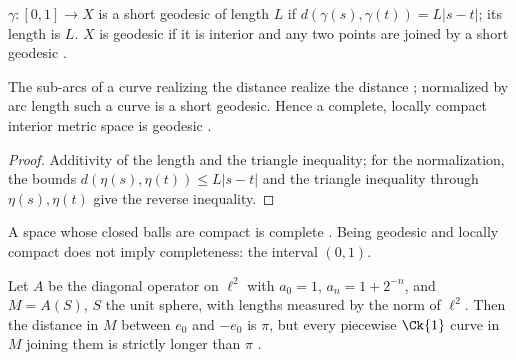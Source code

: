 \begin{definition}
  \label{def:ms-geodesic}
  \leanok
  $\gamma \colon [0, 1] \to X$ is a short geodesic of length $L$ if
  $d(\gamma(s), \gamma(t)) = L |s - t|$; its length is $L$. $X$ is geodesic if it is interior and
  any two points are joined by a short geodesic \cite[Def.~8.1.11]{Lar26}.
\end{definition}

\begin{proposition}
  \label{prop:ms-subarcs}
  \leanok
  The sub-arcs of a curve realizing the distance realize the distance \cite[Obs.~8.1.13]{Lar26};
  normalized by arc length such a curve is a short geodesic. Hence a complete, locally compact
  interior metric space is geodesic \cite[Teorema~8.2.3]{Lar26}.
\end{proposition}

\begin{proof}
  \leanok
  Additivity of the length and the triangle inequality; for the normalization, the bounds
  $d(\eta(s), \eta(t)) \leq L|s - t|$ and the triangle inequality through $\eta(s), \eta(t)$ give the
  reverse inequality.
\end{proof}

\begin{remark}
  \label{rem:ms-proper}
  \leanok
  A space whose closed balls are compact is complete \cite[Obs.~8.2.4]{Lar26}. Being geodesic and
  locally compact does not imply completeness: the interval $(0, 1)$.
\end{remark}

\begin{example}
  \label{ex:ms-mcalpin}
  \leanok
  Let $A$ be the diagonal operator on $\ell^2$ with $a_0 = 1$, $a_n = 1 + 2^{-n}$, and
  $M = A(S)$, $S$ the unit sphere, with lengths measured by the norm of $\ell^2$. Then the distance
  in $M$ between $e_0$ and $-e_0$ is $\pi$, but every piecewise $\Ck{1}$ curve in $M$ joining them
  is strictly longer than $\pi$ \cite[Ejemplo~10.4.2]{Lar26}.
\end{example}

